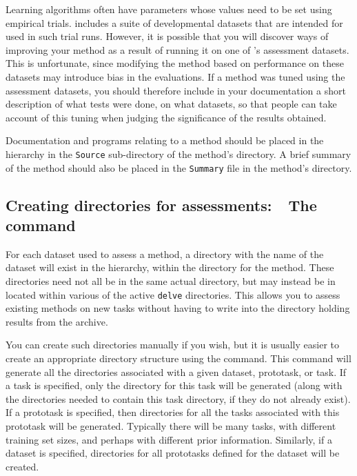 Learning algorithms often have parameters whose values need to be set
using empirical trials. \delve{} includes a suite of developmental
datasets that are intended for used in such trial runs. However, it is
possible that you will discover ways of improving your method as a
result of running it on one of \delve{}'s assessment datasets. This is
unfortunate, since modifying the method based on performance on these
datasets may introduce bias in the evaluations.  If a method was tuned
using the assessment datasets, you should therefore include in your
documentation a short description of what tests were done, on what
datasets, so that people can take account of this tuning when judging
the significance of the results obtained.

Documentation and programs relating to a method should be placed in
the \delve{} hierarchy in the \texttt{Source} sub-directory of the
method's directory.  A brief summary of the method should also be
placed in the \texttt{Summary} file in the method's directory.


\subsection{Creating directories for assessments:~~The \mgendir{}
            command}\label{scheme-mgendir}

For each dataset used to assess a method, a directory with the name of
the dataset will exist in the \delve{} hierarchy, within the directory
for the method.  These directories need not all be in the same actual
directory, but may instead be in located within various of the active
\texttt{delve} directories.  This allows you to assess existing
methods on new tasks without having to write into the directory
holding results from the \delve{} archive.

You can create such directories manually if you wish, but it is
usually easier to create an appropriate directory structure using the
\mgendir{} command.  This command will generate all the directories
associated with a given dataset, prototask, or task. If a task is
specified, only the directory for this task will be generated (along
with the directories needed to contain this task directory, if they do
not already exist). If a prototask is specified, then directories for
all the tasks associated with this prototask will be generated.
Typically there will be many tasks, with different training set sizes,
and perhaps with different prior information.  Similarly, if a dataset
is specified, directories for all prototasks defined for the dataset
will be created.

